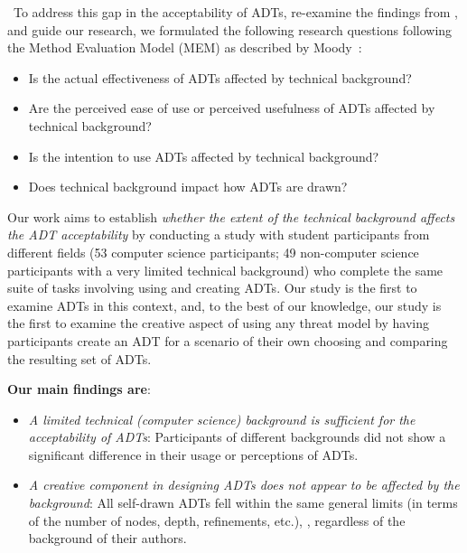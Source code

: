 \ To address this gap in the acceptability of ADTs, re-examine the findings from \cite{lallieEmpiricalEvaluationEffectiveness2017}, and guide our research, we formulated the following research questions following the Method Evaluation Model (MEM) as described by Moody~\cite{moodyMethodEvaluationModel2003}:

\begin{itemize}
\setlength{\itemindent}{1.2em}
    \item[\RQ{1}] Is the actual effectiveness of ADTs affected by technical background?
    \item[\RQ{2}] Are the perceived ease of use or perceived usefulness of ADTs affected by technical background?
    \item[\RQ{3}] Is the intention to use ADTs affected by technical background?
    \item[\RQ{4}] Does technical background impact how ADTs are drawn?
\end{itemize}

Our work aims to establish \emph{whether the extent of the technical background affects the ADT acceptability} by conducting a study with student participants from different fields (53 computer science participants; 49 non-computer science participants with a very limited technical background) who complete the same suite of tasks involving using and creating ADTs. Our study is the first to examine ADTs in this context, and, to the best of our knowledge, our study is the first to examine the creative aspect of using any threat model by having participants create an ADT for a scenario of their own choosing and comparing the resulting set of ADTs.


\textbf{Our main findings are}:
\begin{itemize}
    \item \emph{A limited technical (computer science) background is sufficient for the acceptability of ADTs}: Participants of different backgrounds did not show a significant difference in their usage or perceptions of ADTs.

    \item \emph{A creative component in designing ADTs does not appear to be affected by the background}: All self-drawn ADTs fell within the same general limits (in terms of the number of nodes, depth, refinements, etc.), , regardless of the background of their authors.
\end{itemize}

